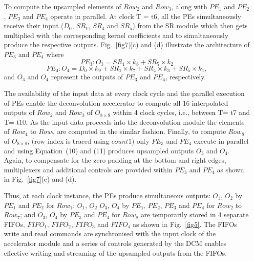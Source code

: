\documentclass[journal]{IEEEtran}
\begin{document}
To compute the upsampled elements of $Row_2$ and $Row_3$, along with $PE_1$ and $PE_2$, $PE_3$ and $PE_4$ operate in parallel. At clock T = t6, all the PEs simultaneously receive their input ($D_0$, $SR_1$, $SR_4$ and $SR_5$) from the SR module which then gets multiplied with the corresponding kernel coefficients and to simultaneously produce the respective outputs. Fig.~\ref{fig7}(c) and (d) illustrate the architecture of $PE_3$ and $PE_4$ where  
\begin{equation}PE_3: O_3 = SR_1 \times k_8 +SR_5 \times k_2 \end{equation}
\begin{equation}PE_4: O_4 = D_0 \times k_9 + SR_1 \times k_7 + SR_4 \times k_3 + SR_5 \times k_1, \end{equation}	
and $O_3$ and $O_4$ represent the outputs of $PE_3$ and $PE_4$, respectively.
	
The availability of the input data at every clock cycle and the parallel execution of PEs enable the deconvolution accelerator to compute all 16 interpolated outputs of $Row_2$ and $Row_3$ of $O_{8 \times 8}$ within 4 clock cycles, i.e., between T= t7 and T= t10. As the input data proceeds into the deconvolution module the elements of $Row_4$ to $Row_7$ are computed in the similar fashion. Finally, to compute $Row_8$ of $O_{8 \times 8}$, (row index is traced using $count1$) only $PE_3$ and $PE_4$ execute in parallel  and using Equation~(10) and (11) produces upsampled outputs $O_3$ and  $O_4$. Again, to compensate for the zero padding at the bottom and right edges, multiplexers and additional controls are provided within $PE_3$ and $PE_4$ as shown in Fig.~\ref{fig7}(c) and (d).

Thus, at each clock instance, the PEs produce simultaneous outputs: $O_1$, $O_2$ by $PE_1$ and $PE_2$ for $Row_1$; $O_1$, $O_2$ $O_3$, $O_4$  by $PE_1$, $PE_2$, $PE_3$ and $PE_4$ for $Row_2$ to $Row_7$; and $O_3$, $O_4$ by $PE_3$ and $PE_4$ for $Row_8$  are temporarily stored in 4 separate FIFOs, $FIFO_1$, $FIFO_2$, $FIFO_3$ and $FIFO_4$ as shown in Fig.~\ref{fig5}.  The FIFOs write and read commands are synchronised with the input clock of the accelerator module and a series of controls generated by the DCM enables effective writing and streaming of the upsampled outputs from the FIFOs.
\end{document}
